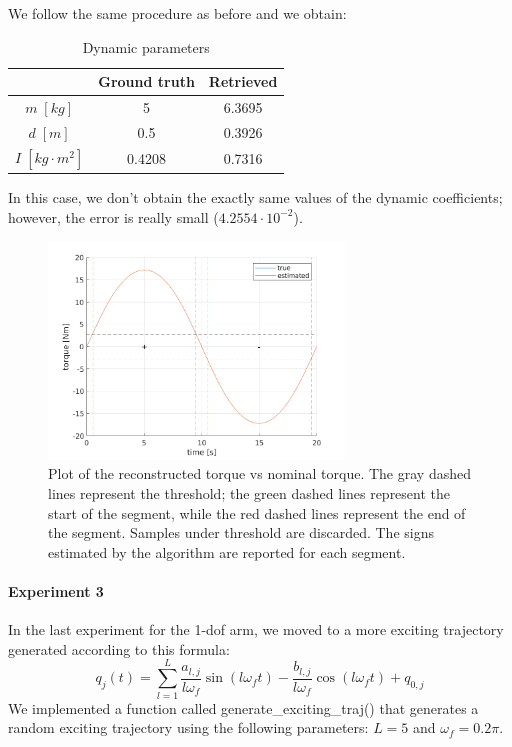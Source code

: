 \documentclass{article}
\begin{document}
We follow the same procedure as before and we obtain:

\begin{table}[!htbp]
\centering
\begin{tabular}{|c|cc|}
\hline
& Ground truth & Retrieved\\
\hline
$m\;[kg]$ & 5 & 6.3695\\ 
$d\;[m]$ & 0.5 & 0.3926\\
$I\;[kg\cdot m^2]$ & 0.4208 & 0.7316\\
\hline
\end{tabular}
\caption{Dynamic parameters}
\end{table}
\FloatBarrier

In this case, we don't obtain the exactly same values of the dynamic coefficients; however, the error is really small ($4.2554 \cdot 10^{-2}$).

\begin{figure}[!htbp]
\centering
\includegraphics[width=0.7\textwidth]{images/1-dof/results2.png}
\caption{Plot of the reconstructed torque vs nominal torque. The gray dashed lines represent the threshold; the green dashed lines represent the start of the segment, while the red dashed lines represent the end of the segment. Samples under threshold are discarded. The signs estimated by the algorithm are reported for each segment.}
\end{figure}
\FloatBarrier

\paragraph{Experiment 3} In the last experiment for the 1-dof arm, we moved to a more exciting trajectory generated according to this formula:
\[q_j(t) = \sum_{l=1}^{L}{\frac{ a_{l,j}}{ l\omega_f }\sin(l\omega_f t)-\frac{ b_{l,j}}{l\omega_f}\cos(l\omega_f t)+q_{0,j}}\]
We implemented a function called generate\_exciting\_traj() that generates a random exciting trajectory using the following parameters: $L = 5$ and $\omega_f = 0.2\pi$.
\end{document}
